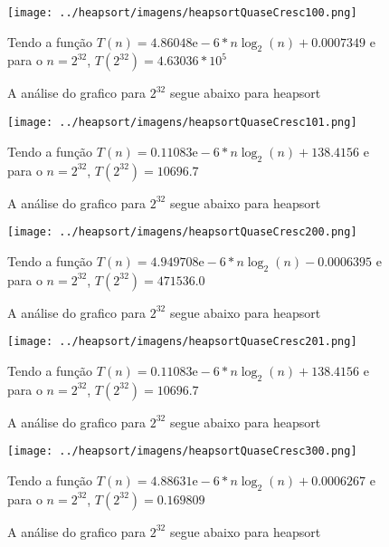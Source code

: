 \documentclass[12pt,a4paper,twoside]{report}
\begin{document}


\begin{figure}[ht]
\centering \texttt{[image: ../heapsort/imagens/heapsortQuaseCresc100.png]}
\caption{A análise do grafico para $2^{32}$ segue abaixo para heapsort}

Tendo a função $T(n) = 4.86048\mathrm{e}-6*n\log_{2}(n)+0.0007349$ e para o $n =2^{32}$, $T(2^{32}) = 4.63036*10^{5}$
\label{fig:heapsortQuaseCresc100}
\end{figure}

\begin{figure}[ht]
\centering \texttt{[image: ../heapsort/imagens/heapsortQuaseCresc101.png]}
\caption{A análise do grafico para $2^{32}$ segue abaixo para heapsort}

Tendo a função $T(n) = 0.11083\mathrm{e}-6*n\log_{2}(n)+138.4156$ e para o $n =2^{32}$, $T(2^{32}) =10696.7 $
\label{fig:heapsortQuaseCresc101}
\end{figure}




\begin{figure}[ht]
\centering \texttt{[image: ../heapsort/imagens/heapsortQuaseCresc200.png]}
\caption{A análise do grafico para $2^{32}$ segue abaixo para heapsort}

Tendo a função $T(n) = 4.949708\mathrm{e}-6*n\log_{2}(n)-0.0006395$ e para o $n =2^{32}$, $T(2^{32}) = 471536.0$
\label{fig:heapsortQuaseCresc200}
\end{figure}

\begin{figure}[ht]
\centering \texttt{[image: ../heapsort/imagens/heapsortQuaseCresc201.png]}
\caption{A análise do grafico para $2^{32}$ segue abaixo para heapsort}

Tendo a função $T(n) = 0.11083\mathrm{e}-6*n\log_{2}(n)+138.4156$ e para o $n =2^{32}$, $T(2^{32}) = 10696.7$
\label{fig:heapsortQuaseCresc201}
\end{figure}

\clearpage


\begin{figure}[ht]
\centering \texttt{[image: ../heapsort/imagens/heapsortQuaseCresc300.png]}
\caption{A análise do grafico para $2^{32}$ segue abaixo para heapsort}

Tendo a função $T(n) = 4.88631\mathrm{e}-6*n\log_{2}(n)+0.0006267$ e para o $n =2^{32}$, $T(2^{32}) = 0.169809$
\label{fig:heapsortQuaseCresc300}
\end{figure}
\end{document}
